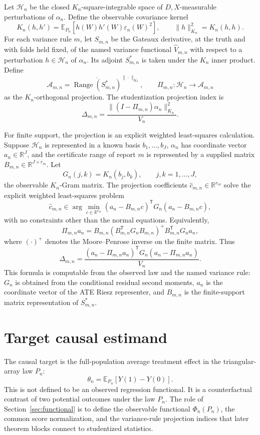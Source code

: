 \documentclass[11pt]{article}
\newcommand{\E}{\mathbb{E}}
\newcommand{\transpose}{\mathsf{T}}
\newcommand{\R}{\mathbb{R}}
\theoremstyle{definition}
\theoremstyle{plain}
\theoremstyle{remark}
\begin{document}
Let \(\mathcal H_n\) be the closed \(K_n\)-square-integrable space of
\(D,X\)-measurable perturbations of \(\alpha_n\).  Define the observable
covariance kernel
\[
  K_n(h,h')=
  \E_{P_n}\!\left[h(W)h'(W)\varepsilon_n(W)^2\right],
  \qquad \|h\|_{K_n}^2=K_n(h,h).
\]
For each variance rule \(m\), let \(S_{m,n}\) be the Gateaux derivative, at
the truth and with folds held fixed, of the named variance functional
\(\hat V_{m,n}\) with respect to a perturbation \(h\in\mathcal H_n\) of
\(\alpha_n\).  Its adjoint \(S_{m,n}^*\) is taken under the \(K_n\) inner
product.  Define
\[
  \mathcal A_{m,n}
  =
  \overline{\operatorname{Range}(S_{m,n}^*)}^{\|\cdot\|_{K_n}},
  \qquad
  \Pi_{m,n}:\mathcal H_n\to\mathcal A_{m,n}
\]
as the \(K_n\)-orthogonal projection.  The studentization projection index is
\[
  \Delta_{m,n}
  =
  \frac{\|(I-\Pi_{m,n})\alpha_n\|_{K_n}^2}{V_n}.
\]

For finite support, the projection is an explicit weighted least-squares
calculation.  Suppose \(\mathcal H_n\) is represented in a known basis
\(b_1,\ldots,b_J\), \(\alpha_n\) has coordinate vector \(a_n\in\R^J\), and the
certificate range of report \(m\) is represented by a supplied matrix
\(B_{m,n}\in\R^{J\times r_m}\).  Let
\[
  G_n(j,k)=K_n(b_j,b_k),\qquad j,k=1,\ldots,J,
\]
the observable \(K_n\)-Gram matrix.  The projection coefficients
\(\hat c_{m,n}\in\R^{r_m}\) solve the explicit weighted least-squares problem
\[
  \hat c_{m,n}\in
  \arg\min_{c\in\R^{r_m}}(a_n-B_{m,n}c)^{\transpose}G_n(a_n-B_{m,n}c),
\]
with no constraints other than the normal equations.  Equivalently,
\[
  \Pi_{m,n}a_n
  =
  B_{m,n}(B_{m,n}^{\transpose}G_nB_{m,n})^+
  B_{m,n}^{\transpose}G_na_n,
\]
where \((\cdot)^+\) denotes the Moore--Penrose inverse on the finite matrix.
Thus
\[
  \Delta_{m,n}=
  \frac{(a_n-\Pi_{m,n}a_n)^{\transpose}G_n(a_n-\Pi_{m,n}a_n)}{V_n}.
\]
This formula is computable from the observed law and the named variance rule:
\(G_n\) is obtained from the conditional residual second moments, \(a_n\) is
the coordinate vector of the ATE Riesz representer, and \(B_{m,n}\) is the
finite-support matrix representation of \(S_{m,n}^*\).

\section{Target causal estimand}
The causal target is the full-population average treatment effect in the
triangular-array law \(P_n\):
\[
  \theta_n=\E_{P_n}[Y(1)-Y(0)].
\]
This is not defined to be an observed regression functional.  It is a
counterfactual contrast of two potential outcomes under the law \(P_n\).  The
role of Section~\ref{sec:functional} is to define the observable functional
\(\Phi_n(P_n)\), the common score normalization, and the variance-rule
projection indices that later theorem blocks connect to studentized
statistics.
\end{document}
